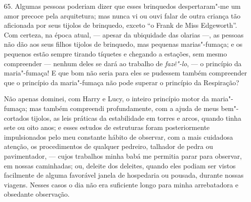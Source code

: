 65. Algumas pessoas poderiam dizer que esses brinquedos despertaram"-me
um amor precoce pela arquitetura; mas nunca vi ou ouvi falar de outra
criança tão aficionada por seus tijolos de brinquedo, exceto ``o Frank
de Miss Edgeworth''. Com certeza, na época atual, --- apesar da
ubiquidade das olarias \mbox{---,} as pessoas não dão aos seus filhos tijolos de
brinquedo, mas pequenas marias"-fumaça; e os pequenos estão sempre
tirando tíquetes e chegando a estações, sem mesmo compreender --- nenhum
deles se dará ao trabalho de \emph{fazê"-lo}, --- o princípio da
maria"-fumaça! E que bom não seria para eles se pudessem também
compreender que o princípio da maria"-fumaça não pode superar o princípio
da Respiração?

Não apenas dominei, com Harry e Lucy, o inteiro princípio motor da
maria"-fumaça; mas também compreendi profundamente, com a ajuda de meus
bem"-cortados tijolos, as leis práticas da estabilidade em torres e
arcos, quando tinha sete ou oito anos; e esses estudos de estruturas
foram posteriormente impulsionados pelo meu constante hábito de
observar, com a mais cuidadosa atenção, os procedimentos de qualquer
pedreiro, talhador de pedra ou pavimentador, --- cujos trabalhos minha
babá me permitia parar para observar, em nossas caminhadas; ou, deleite
dos deleites, quando eles podiam ser vistos facilmente de alguma
favorável janela de hospedaria ou pousada, durante nossas viagens.
Nesses casos o dia não era suficiente longo para minha arrebatadora e
obsedante observação.

